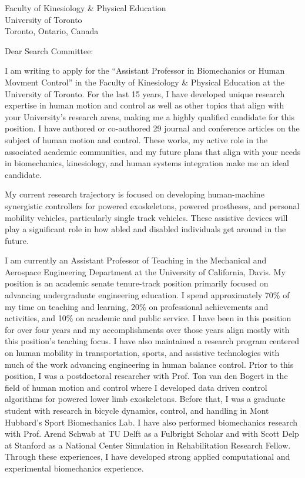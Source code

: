 \documentclass{letter}
\date{}
\begin{document}
\begin{letter}{
  Faculty of Kinesiology \& Physical Education \\
  University of Toronto \\
  Toronto, Ontario, Canada
}

\opening{Dear Search Committee:}

I am writing to apply for the ``Assistant Professor in Biomechanics or Human
Movment Control'' in the Faculty of Kinesiology \& Physical Education at the
University of Toronto. For the last 15 years, I have developed unique research
expertise in human motion and control as well as other topics that align with
your University's research areas, making me a highly qualified candidate for
this position. I have authored or co-authored 29 journal and conference
articles on the subject of human motion and control. These works, my active
role in the associated academic communities, and my future plans that align
with your needs in biomechanics, kinesiology, and human systems integration
make me an ideal candidate.

My current research trajectory is focused on developing human-machine
synergistic controllers for powered exoskeletons, powered prostheses, and
personal mobility vehicles, particularly single track vehicles. These assistive
devices will play a significant role in how abled and disabled individuals get
around in the future.

I am currently an Assistant Professor of Teaching in the Mechanical and
Aerospace Engineering Department at the University of California, Davis. My
position is an academic senate tenure-track position primarily focused on
advancing undergraduate engineering education. I spend approximately 70\% of my
time on teaching and learning, 20\% on professional achievements and
activities, and 10\% on academic and public service. I have been in this
position for over four years and my accomplishments over those years align
mostly with this position's teaching focus. I have also maintained a research
program centered on human mobility in transportation, sports, and assistive
technologies with much of the work advancing engineering in human balance
control. Prior to this position, I was a postdoctoral researcher with Prof. Ton
van den Bogert in the field of human motion and control where I developed data
driven control algorithms for powered lower limb exoskeletons. Before that, I
was a graduate student with research in bicycle dynamics, control, and handling
in Mont Hubbard's Sport Biomechanics Lab. I have also performed biomechanics
research with Prof. Arend Schwab at TU Delft as a Fulbright Scholar and with
Scott Delp at Stanford as a National Center Simulation in Rehabilitation
Research Fellow. Through these experiences, I have developed strong applied
computational and experimental biomechanics experience.


\end{letter}
\end{document}
